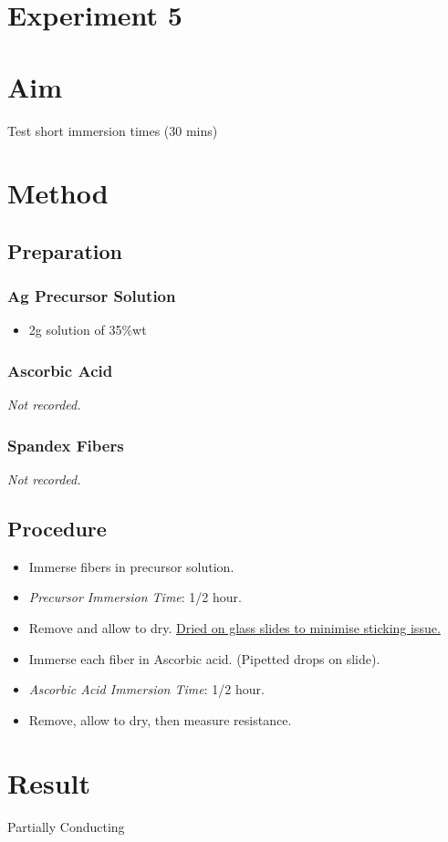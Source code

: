 \documentclass{article}
\begin{document}
\section*{Experiment 5}

\section{Aim}
Test short immersion times (30 mins) 

\section{Method}
\subsection{Preparation}
\subsubsection{Ag Precursor Solution}
\begin{itemize}
    \item  2g solution of  35\%wt
\end{itemize}

\subsubsection{Ascorbic Acid}
\textit{Not recorded.}

\subsubsection{Spandex Fibers}
\textit{Not recorded.}

\subsection{Procedure}
\begin{itemize}
    \item Immerse fibers in precursor solution.
    \item \textit{Precursor Immersion Time}: 1/2 hour.
    \item Remove and allow to dry. \underline{Dried on glass slides to minimise sticking issue.}
    \item Immerse each fiber in Ascorbic acid. (Pipetted drops on slide).
    \item \textit{Ascorbic Acid Immersion Time}: 1/2 hour.
    \item Remove, allow to dry, then measure resistance.
\end{itemize}

\section{Result}
Partially Conducting
\end{document}
